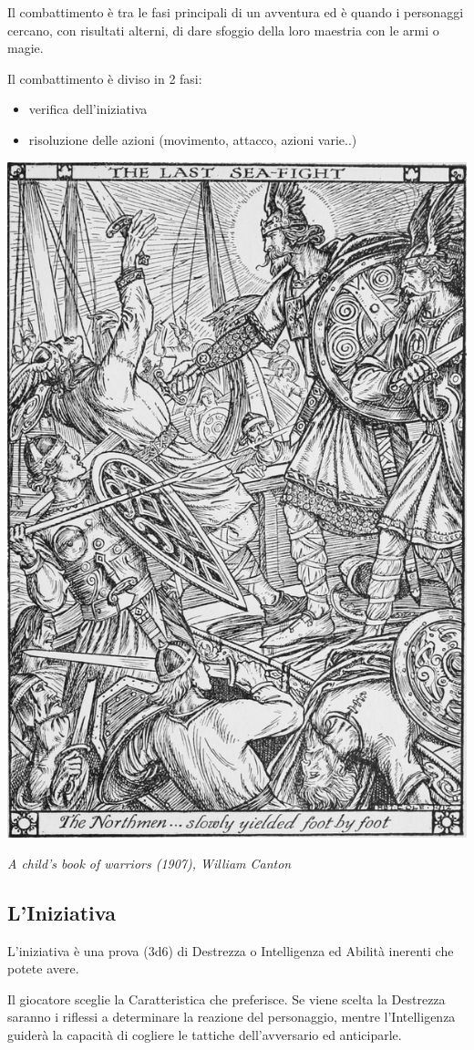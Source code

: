 \begin{multicols}{2}

Il combattimento è tra le fasi principali di un avventura ed è quando i personaggi cercano, con risultati alterni, di dare sfoggio della loro maestria con le armi o magie.

Il combattimento è diviso in 2 fasi:
\begin{itemize}
\item verifica dell'iniziativa
\item risoluzione delle azioni (movimento, attacco, azioni varie..)
\end{itemize}

\begin{center}
\includegraphics[width=0.65\linewidth]{immagini/Achildbookofwarriors.png}

\emph{A child's book of warriors (1907), William Canton}
\end{center}

\subsection{L'Iniziativa}\label{iniziativa}

L'iniziativa è una prova (3d6) di Destrezza o Intelligenza ed Abilità inerenti che potete avere.

Il giocatore sceglie la Caratteristica che preferisce. Se viene scelta la Destrezza saranno i riflessi a determinare la reazione del personaggio, mentre l'Intelligenza guiderà la capacità di cogliere le tattiche dell'avversario ed anticiparle.


\end{multicols}
